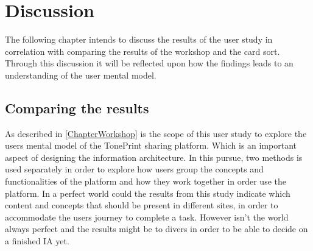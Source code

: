 \chapter{Discussion}
\label{Discussion}
The following chapter intends to discuss the results of the user study in correlation with comparing the results of the workshop and the card sort. Through this discussion it will be reflected upon how the findings leads to an understanding of the user mental model.


\section{Comparing the results}
\label{ComparingResults}
%
As described in \autoref{ChapterWorkshop} is the scope of this user study to explore the users mental model of the TonePrint sharing platform. Which is an important aspect of designing the information architecture. In this pursue, two methods is used separately in order to explore how users group the concepts and functionalities of the platform and how they work together in order use the platform. In a perfect world could the results from this study indicate which content and concepts that should be present in different sites, in order to accommodate the users journey to complete a task. However isn't the world always perfect and the results might be to divers in order to be able to decide on a finished IA yet.\\
\\
